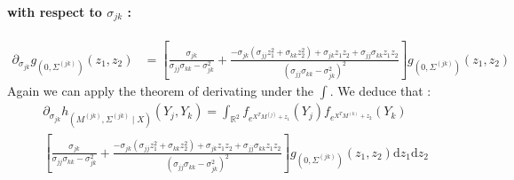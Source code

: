 \documentclass[11pt, a4paper]{article}
\begin{document}
\paragraph{with respect to $\sigma_{jk}$ :}
\begin{align*}
\partial_{\sigma_{jk}}g_{(0,\Sigma^{(jk)})}(z_1,z_2) &= [\frac{\sigma_{jk}}{\sigma_{jj} \sigma_{kk} - \sigma_{jk}^2} + \frac{-\sigma_{jk} ( \sigma_{jj} z_1^2 + \sigma_{kk} z_2^2 ) + \sigma_{jk} z_1 z_2 + \sigma_{jj} \sigma_{kk} z_1 z_2}{(\sigma_{jj} \sigma_{kk} - \sigma_{jk}^2)^2}] g_{(0,\Sigma^{(jk)})}(z_1,z_2)
\end{align*}
Again we can apply the theorem of derivating under the $\int$. We deduce that :
\begin{align*}
&\partial_{\sigma_{jk}} h_{(M^{(jk)},\Sigma^{(jk)} \mid X)}(Y_j,Y_k) =
\int_{\mathbb{R}^2} f_{e^{X^T M^{(j)}+z_1}}(Y_j) f_{e^{X^T M^{(k)}+z_2}}(Y_k)\\
&[   \frac{\sigma_{jk}}{\sigma_{jj} \sigma_{kk} - \sigma_{jk}^2} + \frac{-\sigma_{jk} ( \sigma_{jj} z_1^2 + \sigma_{kk} z_2^2 ) + \sigma_{jk} z_1 z_2 + \sigma_{jj} \sigma_{kk} z_1 z_2}{(\sigma_{jj} \sigma_{kk} - \sigma_{jk}^2)^2}] g_{(0,\Sigma^{(jk)})}(z_1,z_2) \mathrm{d}z_1 \mathrm{d}z_2
\end{align*}
\end{document}
